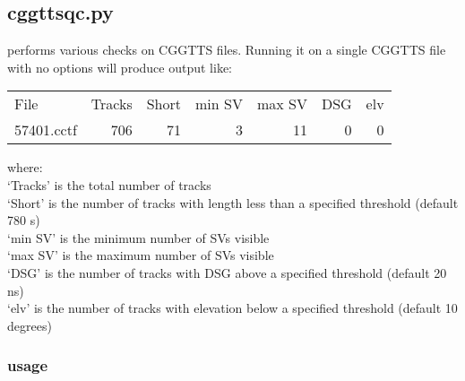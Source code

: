 \subsection{cggttsqc.py}

\hypertarget{h:cggttsqc}{}

 performs various checks on CGGTTS files.
Running it on a single CGGTTS file with no options will produce output like:

\begin{tabular}{lrrrrrr}
File         & Tracks  & Short & min SV & max SV   &  DSG  &  elv \\
57401.cctf   &   706   &  71   &   3    &  11      & 0     &  0   \\
\end{tabular}

where:\\
`Tracks' is the total number of tracks\\
`Short'  is the number of tracks with length less than a specified threshold (default 780 s)\\
`min SV' is the minimum number of SVs visible\\
`max SV' is the maximum number of SVs visible \\
`DSG'    is the number of tracks with DSG above a specified threshold (default 20 ns)\\
`elv'    is the number of tracks with elevation below a specified threshold (default 10 degrees)\\

\subsubsection{usage}


